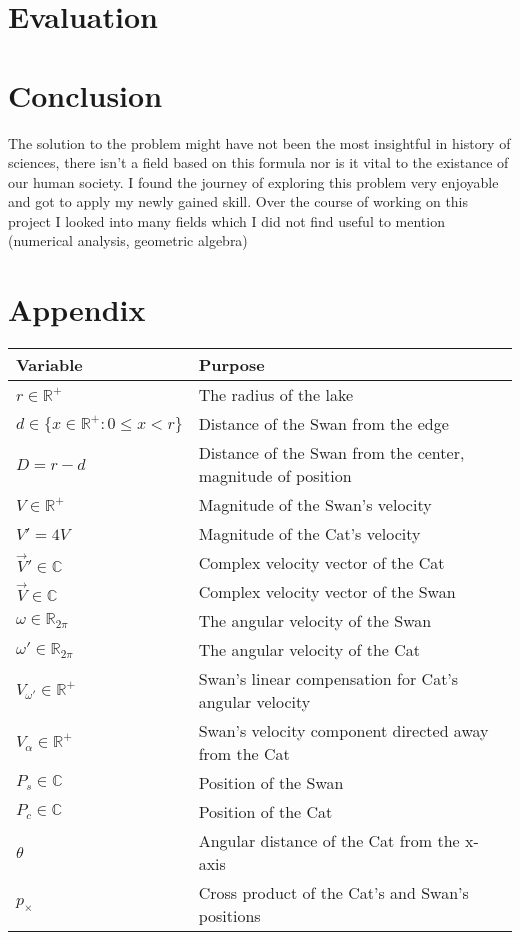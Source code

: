 \documentclass[12pt]{article}
\begin{document}
\section{Evaluation}

\section{Conclusion}

The solution to the problem might have not been the most insightful in history of sciences, there isn't a field based on this formula nor is it vital to the existance of our human society. I found the journey of exploring this problem very enjoyable and got to apply my newly gained skill. Over the course of working on this project I  looked into many fields which I did not find useful to mention (numerical analysis, geometric algebra)

\section*{Appendix}

\begin{tabular}{|l|l|}
\hline
\textbf{Variable} & \textbf{Purpose}\\
\hline
$r \in {\mathbb{R}^+}$ & The radius of the lake\\
$d \in \{x \in \mathbb{R^+}: 0 \leq x < r \}$ & Distance of the Swan from the edge\\
$D = r - d$ & Distance of the Swan from the center, magnitude of position\\
$V \in {\mathbb{R}^+}$ & Magnitude of the Swan's velocity\\
$V' = 4V$ & Magnitude of the Cat's velocity\\
$\vec{V}' \in \mathbb{C}$ & Complex velocity vector of the Cat\\
$\vec{V} \in \mathbb{C}$ & Complex velocity vector of the Swan\\
$\omega \in \mathbb{R}_{2\pi}$ & The angular velocity of the Swan\\
$\omega' \in \mathbb{R}_{2\pi}$ & The angular velocity of the Cat\\
$V_{\omega'} \in \mathbb{R^+}$ & Swan's linear compensation for Cat's angular velocity\\
$V_\alpha \in \mathbb{R^+}$ & Swan's velocity component directed away from the Cat\\
$P_s \in \mathbb{C}$ & Position of the Swan\\
$P_c \in \mathbb{C}$ & Position of the Cat\\
$\theta$ & Angular distance of the Cat from the x-axis\\
$p_\times$ & Cross product of the Cat's and Swan's positions\\
\hline
\end{tabular}
\vspace{12pt}



\end{document}
